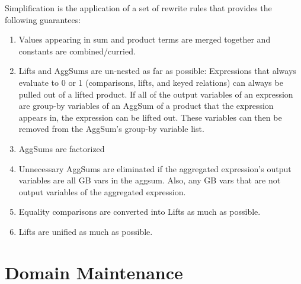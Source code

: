 \documentclass[11pt]{amsart}
\begin{document}
Simplification is the application of a set of rewrite rules that provides the following guarantees:
\begin{enumerate}
\item Values appearing in sum and product terms are merged together and constants are combined/curried.
\item Lifts and AggSums are un-nested as far as possible: Expressions that always evaluate to 0 or 1 (comparisons, lifts, and keyed relations) can always be pulled out of a lifted product.  If all of the output variables of an expression are group-by variables of an AggSum of a product that the expression appears in, the expression can be lifted out.  These variables can then be removed from the AggSum's group-by variable list.
\item AggSums are factorized
\item Unnecessary AggSums are eliminated if the aggregated expression's output variables are all GB vars in the aggsum.  Also, any GB vars that are not output variables of the aggregated expression.
\item Equality comparisons are converted into Lifts as much as possible.
\item Lifts are unified as much as possible.
\end{enumerate}


\section{Domain Maintenance}
\end{document}

